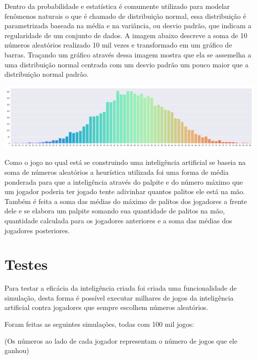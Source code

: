\documentclass{article}
\begin{document}
Dentro da probabilidade e estatística é comumente utilizado para modelar fenômenos naturais o que é chamado de distribuição normal, essa distribuição é parametrizada baseada na média e na variância, ou desvio padrão, que indicam a regularidade de um conjunto de dados. A imagem abaixo descreve a soma de 10 números aleatórios realizado 10 mil vezes e transformado em um gráfico de barras. Traçando um gráfico através dessa imagem mostra que ela se assemelha a uma distribuição normal centrada com um desvio padrão um pouco maior que a distribuição normal padrão.

\includegraphics[width=\textwidth]{soma_de_randoms}

Como o jogo no qual está se construindo uma inteligência artificial se baseia na soma de números aleatórios a heurística utilizada foi uma forma de média ponderada para que a inteligência através do palpite e do número máximo que um jogador poderia ter jogado tente adivinhar quantos palitos ele está na mão. Também é feita a soma das médias do máximo de palitos dos jogadores a frente dele e se elabora um palpite somando sua quantidade de palitos na mão, quantidade calculada para os jogadores anteriores e a soma das médias dos jogadores posteriores.

\section{Testes}

Para testar a eficácia da inteligência criada foi criada uma funcionalidade de simulação, desta forma é possível executar milhares de jogos da inteligência artificial contra jogadores que sempre escolhem números aleatórios.

Foram feitas as seguintes simulações, todas com 100 mil jogos:

(Os números ao lado de cada jogador representam o número de jogos que ele ganhou)
\end{document}
